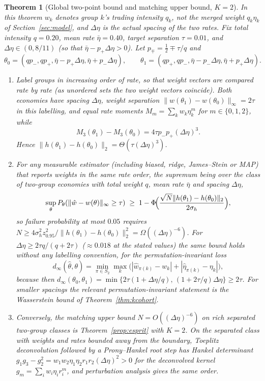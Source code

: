 \documentclass[12pt]{article}
\newtheorem{theorem}{Theorem}[section]
\theoremstyle{definition}
\theoremstyle{remark}
\begin{document}
\begin{theorem}[Global two-point bound and matching upper bound, $K=2$]\label{thm:twocohort}
In this theorem $w_k$ denotes group $k$'s trading intensity $q_k$, not the merged weight $q_k\eta_k$ of Section~\ref{sec:model}, and $\Delta\eta$ is the actual spacing of the two rates. Fix total intensity $q=0.20$, mean rate $\bar\eta=0.40$, target separation $\tau=0.01$, and $\Delta\eta\in(0,8/11)$ (so that $\bar\eta-p_+\Delta\eta>0$). Let $p_\mp=\tfrac12\mp\tau/q$ and
\begin{equation}\label{eq:pair}
\theta_0=(qp_-,qp_+,\bar\eta-p_+\Delta\eta,\bar\eta+p_-\Delta\eta),\qquad\theta_1=(qp_+,qp_-,\bar\eta-p_-\Delta\eta,\bar\eta+p_+\Delta\eta).
\end{equation}
\begin{enumerate}[label=(\roman*)]
\item Label groups in increasing order of rate, so that weight vectors are compared rate by rate (as unordered sets the two weight vectors coincide). Both economies have spacing $\Delta\eta$, weight separation $\|w(\theta_1)-w(\theta_0)\|_\infty=2\tau$ in this labelling, and equal rate moments $M_m=\sum_kw_k\eta_k^m$ for $m\in\{0,1,2\}$, while
\begin{equation}\label{eq:dM3}
M_3(\theta_1)-M_3(\theta_0)=4\tau p_-p_+(\Delta\eta)^3 .
\end{equation}
Hence $\|h(\theta_1)-h(\theta_0)\|_2=\Theta(\tau(\Delta\eta)^3)$.
\item For any measurable estimator (including biased, ridge, James--Stein or MAP) that reports weights in the same rate order, the supremum being over the class of two-group economies with total weight $q$, mean rate $\bar\eta$ and spacing $\Delta\eta$,
\begin{equation}\label{eq:lecam2}
\sup_\theta P_\theta(\|\hat w-w(\theta)\|_\infty\ge\tau)\;\ge\;1-\Phi\!\Bigl(\frac{\sqrt N\|h(\theta_1)-h(\theta_0)\|_2}{2\sigma_h}\Bigr),
\end{equation}
so failure probability at most $0.05$ requires $N\ge4\sigma_h^2z_{0.95}^2/\|h(\theta_1)-h(\theta_0)\|_2^2=\Omega((\Delta\eta)^{-6})$. For $\Delta\eta\ge2\tau q/(q+2\tau)$ ($\approx0.018$ at the stated values) the same bound holds without any labelling convention, for the permutation-invariant loss
\[
d_\infty(\hat\theta,\theta)=\min_{\pi\in S_2}\max_{k}\bigl(|\hat w_{\pi(k)}-w_k|+|\hat\eta_{\pi(k)}-\eta_k|\bigr),
\]
because then $d_\infty(\theta_0,\theta_1)=\min\{2\tau(1+\Delta\eta/q),\,(1+2\tau/q)\Delta\eta\}\ge2\tau$. For smaller spacings the relevant permutation-invariant statement is the Wasserstein bound of Theorem~\ref{thm:kcohort}.
\item Conversely, the matching upper bound $N=O((\Delta\eta)^{-6})$ on rich separated two-group classes is Theorem~\ref{prop:esprit} with $K=2$. On the separated class with weights and rates bounded away from the boundary, Toeplitz deconvolution followed by a Prony--Hankel root step has Hankel determinant $g_1g_3-g_2^2=w_1w_2\eta_1\eta_2r_1r_2(\Delta\eta)^2>0$ for the deconvolved kernel $g_m=\sum_iw_i\eta_ir_i^m$, and perturbation analysis gives the same order.
\end{enumerate}
\end{theorem}
\end{document}

